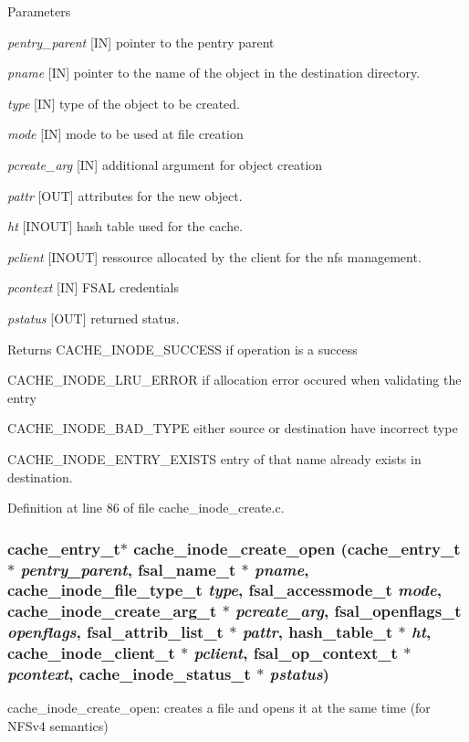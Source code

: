 \begin{DoxyParams}{Parameters}
\item[{\em pentry\_\-parent}][IN] pointer to the pentry parent \item[{\em pname}][IN] pointer to the name of the object in the destination directory. \item[{\em type}][IN] type of the object to be created. \item[{\em mode}][IN] mode to be used at file creation \item[{\em pcreate\_\-arg}][IN] additional argument for object creation \item[{\em pattr}][OUT] attributes for the new object. \item[{\em ht}][INOUT] hash table used for the cache. \item[{\em pclient}][INOUT] ressource allocated by the client for the nfs management. \item[{\em pcontext}][IN] FSAL credentials \item[{\em pstatus}][OUT] returned status.\end{DoxyParams}
\begin{DoxyReturn}{Returns}
CACHE\_\-INODE\_\-SUCCESS if operation is a success \par
 

CACHE\_\-INODE\_\-LRU\_\-ERROR if allocation error occured when validating the entry\par
 

CACHE\_\-INODE\_\-BAD\_\-TYPE either source or destination have incorrect type\par
 

CACHE\_\-INODE\_\-ENTRY\_\-EXISTS entry of that name already exists in destination. 
\end{DoxyReturn}


Definition at line 86 of file cache\_\-inode\_\-create.c.
\subsubsection[{cache\_\-inode\_\-create\_\-open}]{\setlength{\rightskip}{0pt plus 5cm}cache\_\-entry\_\-t$\ast$ cache\_\-inode\_\-create\_\-open (cache\_\-entry\_\-t $\ast$ {\em pentry\_\-parent}, \/  fsal\_\-name\_\-t $\ast$ {\em pname}, \/  cache\_\-inode\_\-file\_\-type\_\-t {\em type}, \/  fsal\_\-accessmode\_\-t {\em mode}, \/  cache\_\-inode\_\-create\_\-arg\_\-t $\ast$ {\em pcreate\_\-arg}, \/  fsal\_\-openflags\_\-t {\em openflags}, \/  fsal\_\-attrib\_\-list\_\-t $\ast$ {\em pattr}, \/  hash\_\-table\_\-t $\ast$ {\em ht}, \/  cache\_\-inode\_\-client\_\-t $\ast$ {\em pclient}, \/  fsal\_\-op\_\-context\_\-t $\ast$ {\em pcontext}, \/  cache\_\-inode\_\-status\_\-t $\ast$ {\em pstatus})}\label{cache__inode__create_8c_adf579a07e747b4c05adb6393c836c518}
cache\_\-inode\_\-create\_\-open: creates a file and opens it at the same time (for NFSv4 semantics)

